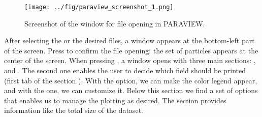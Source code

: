 \documentclass{../GPUSPHtemplate}
\begin{document}
\begin{figure}[h]
  \begin{center}
    \texttt{[image: ../fig/paraview\_screenshot\_1.png]}
    \caption{Screenshot of the window for file opening in PARAVIEW.}\label{fig:paraview_screenshot_1}   
  \end{center}
\end{figure}
After selecting the  or the desired  files, 
a window appears at the bottom-left part of the screen. 
Press  to confirm the file opening: the set of particles
appears at the center of the screen.
When pressing , a window opens with three main sections: 
,  and . 
The second one enables the user to decide which field should be printed 
(first tab of the section ). 
With the  option, we can make the color legend appear, 
and with the  one, we can customize it. 
Below this section we find a set of options that enables us to manage the plotting as desired.
The  section provides information like the total size of the dataset.
\end{document}
